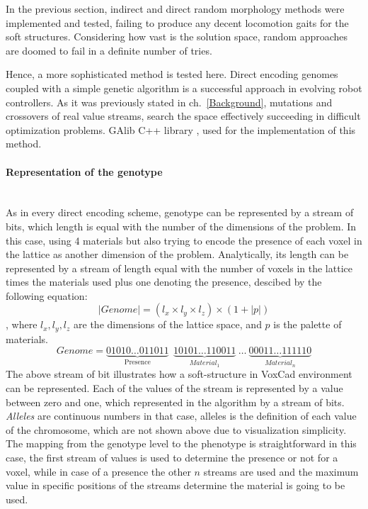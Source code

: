 In the previous section, indirect and direct random morphology methods were implemented and tested, failing to produce any decent locomotion gaits for the soft structures. Considering how vast is the solution space, random approaches are doomed to fail in a definite number of tries. 

Hence, a more sophisticated method is tested here. Direct encoding genomes coupled with a simple genetic algorithm is a successful approach in evolving robot controllers. As it was previously stated in ch.~\ref{Background}, mutations and crossovers of real value streams, search the space effectively succeeding in difficult optimization problems. GAlib C++ library \cite{wall1996galib}, used for the implementation of this method.

\paragraph*{Representation of the genotype}~\\
As in every direct encoding scheme, genotype can be represented by a stream of bits, which length is equal with the number of the dimensions of the problem. In this case, using 4 materials but also trying to encode the presence of each voxel in the lattice as another dimension of the problem. Analytically, its length can be represented by a stream of length equal with the number of voxels in the lattice times the materials used plus one denoting the presence, descibed by the following equation:
\begin{equation}
\label{lengthDirect}
| Genome | = (l_x \times l_y \times l_z ) \times (1 + |p|)
\end{equation}
, where $l_x, l_y, l_z$ are the dimensions of the lattice space, and $p$ is the palette of materials.
\begin{equation*}
Genome = \underbrace{01010\ldots011011}_\text{Presence}\ \    \underbrace{10101\ldots110011}_{Material_1} \   \ldots\  \underbrace{00011\ldots111110}_{Material_n}
\end{equation*}
The above stream of bit illustrates how a soft-structure in VoxCad environment can be represented. Each of the values of the stream is represented by a value between zero and one, which represented 
in the algorithm by a stream of bits. \emph{Alleles} are continuous numbers in that case, alleles is the definition of each value of the chromosome, which are not shown above due to visualization simplicity. The mapping from the genotype level to the phenotype is straightforward in this case, the first stream of values is used to determine the presence or not for a voxel, while in case of a presence the other $n$ streams are used and the maximum value in specific positions of the streams determine the material is going to be used.

